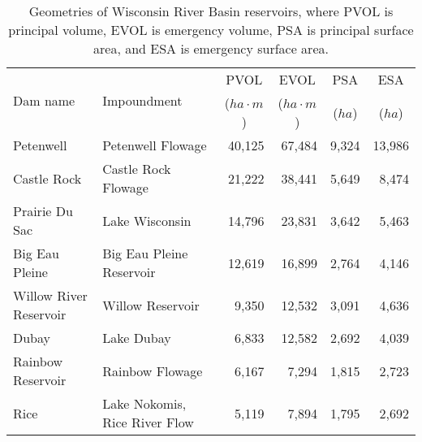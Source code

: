 \begin{table}[h!]
	\caption[Geometries of Wisconsin River Basin reservoirs]{Geometries of Wisconsin River Basin reservoirs, where PVOL is principal volume, EVOL is emergency volume, PSA is principal surface area, and ESA is emergency surface area.}
	\centering
	\begin{tabular}{llrrrr}
\hline
		\multirow{2}{*}{Dam  name} & \multirow{2}{*}{Impoundment}  & \multicolumn{1}{c}{PVOL}             & \multicolumn{1}{c}{EVOL}             & \multicolumn{1}{c}{PSA}    & \multicolumn{1}{c}{ESA}    \\
                                   &                               & \multicolumn{1}{c}{($ha \cdot m$)}   & \multicolumn{1}{c}{($ha \cdot m$)}   & \multicolumn{1}{c}{($ha$)} & \multicolumn{1}{c}{($ha$)} \\
\hline \hline
		Petenwell                  & Petenwell Flowage             & 40,125                               & 67,484                               & 9,324                      & 13,986                     \\
		Castle Rock                & Castle Rock Flowage           & 21,222                               & 38,441                               & 5,649                      & 8,474                      \\
		Prairie Du Sac             & Lake Wisconsin                & 14,796                               & 23,831                               & 3,642                      & 5,463                      \\
		Big Eau Pleine             & Big Eau Pleine Reservoir      & 12,619                               & 16,899                               & 2,764                      & 4,146                      \\
		Willow River Reservoir     & Willow Reservoir              & 9,350                                & 12,532                               & 3,091                      & 4,636                      \\
		Dubay                      & Lake Dubay                    & 6,833                                & 12,582                               & 2,692                      & 4,039                      \\
		Rainbow Reservoir          & Rainbow Flowage               & 6,167                                & 7,294                                & 1,815                      & 2,723                      \\
		Rice                       & Lake Nokomis, Rice River Flow & 5,119                                & 7,894                                & 1,795                      & 2,692                      \\

\end{tabular}
\end{table}
